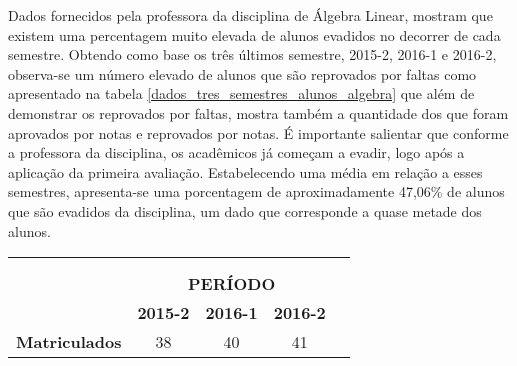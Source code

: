 \noindent Dados fornecidos pela professora da disciplina de Álgebra Linear, mostram que existem uma percentagem muito elevada de alunos evadidos no decorrer de cada semestre. Obtendo como base os três últimos semestre, 2015-2, 2016-1 e 2016-2, observa-se um número elevado de alunos que são reprovados por faltas como apresentado na tabela \ref{dados_tres_semestres_alunos_algebra} que além de demonstrar os reprovados por faltas, mostra também a quantidade dos que foram aprovados por notas e reprovados por notas. É importante salientar que conforme a professora da disciplina, os acadêmicos já começam a evadir, logo após a aplicação da primeira avaliação. Estabelecendo uma média em relação a esses semestres, apresenta-se uma porcentagem de aproximadamente 47,06\% de alunos que são evadidos da disciplina, um dado que corresponde a quase metade dos alunos.
\begin{table}[!htp]
    \centering
    \begin{tabular}{lcccl}
                                                                            & \multicolumn{1}{l}{}                                         & \multicolumn{1}{l}{}                                         & \multicolumn{1}{l}{}                                         &  \\
                                                                            & \multicolumn{1}{l}{}                                         & \multicolumn{1}{l}{}                                         & \multicolumn{1}{l}{}                                         &  \\ \cline{1-4}
\multicolumn{1}{|l|}{}                                                      & \multicolumn{3}{c|}{\textbf{PERÍODO}}                                                                                                                                                      &  \\ \cline{2-4}
\multicolumn{1}{|l|}{\multirow{-2}{*}{}}                                    & \multicolumn{1}{c|}{\cellcolor[HTML]{EFEFEF}\textbf{2015-2}} & \multicolumn{1}{c|}{\cellcolor[HTML]{EFEFEF}\textbf{2016-1}} & \multicolumn{1}{c|}{\cellcolor[HTML]{EFEFEF}\textbf{2016-2}} &  \\ \cline{1-4}
\multicolumn{1}{|c|}{\textbf{Matriculados}}                                 & \multicolumn{1}{c|}{38}                                      & \multicolumn{1}{c|}{40}                                      & \multicolumn{1}{c|}{41}                                      &  \\ \cline{1-4}

\end{tabular}
\end{table}
